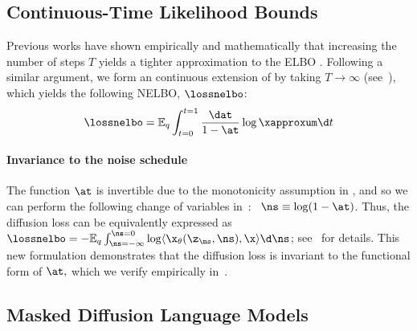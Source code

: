 \documentclass{article} %
\begin{document}
\subsection{Continuous-Time Likelihood Bounds}\label{subsec:continuous_elbo}
Previous works have shown empirically and mathematically that increasing the number of steps $T$ yields a tighter approximation to the ELBO \citep{kingma2021variational}.
Following a similar argument, we form an continuous extension of  by taking $T \to \infty$ (see~), which yields the following NELBO, $\lossnelbo$:
\begin{align}\label{eqn:dif_loss_cont_subs}
    \lossnelbo
    = \mathbb{E}_{q}\int_{t=0}^{t=1} \frac{\dat}{1 - \at} \log \xapproxum \d t
\end{align}
\paragraph{Invariance to the noise schedule}
The function $\at$ is invertible due to the monotonicity assumption in , and so we can perform the following change of variables in~:~ $\ns \equiv \log(1 - \at)$. Thus, the diffusion loss can be equivalently expressed as
$\lossnelbo  
= - \mathbb{E}_{q}\int_{\ns = -\infty}^{\ns = 0} \log \langle \x_{\theta}(\z_\ns, \ns), \x \rangle \d \ns$; see~ for details.
This new formulation demonstrates that the diffusion loss is invariant to the functional form of $\at,$ which we verify empirically 
in~.



\subsection{Masked Diffusion Language Models}\label{subsec:mdlm}
\end{document}
